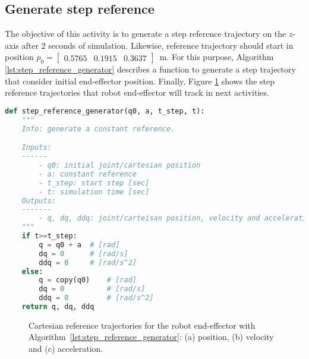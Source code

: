 \graphicspath{{images/act_1.2/}}
\subsection{Generate step reference}
\label{subsec:generate_step_reference}
The objective of this activity is to generate a step reference trajectory on the $z$-axis after $2$ seconds of simulation. Likewise, reference trajectory should start in position $p_0=\begin{bmatrix}  0.5765 &   0.1915 &   0.3637 \end{bmatrix}$~m. For this purpose, Algorithm \ref{lst:step_reference_generator} describes a function to generate a step trajectory that consider initial end-effector position. Finally, Figure \ref{fig:act_1.2_step_reference} shows the step reference trajectories that robot end-effector will track in next activities. \vspace{.5cm}

\begin{lstlisting}[language=Python,caption=Function to generate a step reference trajectory., label={lst:step_reference_generator}]
def step_reference_generator(q0, a, t_step, t):
    """
    Info: generate a constant reference.

    Inputs:
    ------
        - q0: initial joint/cartesian position
        - a: constant reference
        - t_step: start step [sec]
        - t: simulation time [sec]
    Outputs:
    -------
        - q, dq, ddq: joint/carteisan position, velocity and acceleration
    """
    if t>=t_step:
        q = q0 + a  # [rad]
        dq = 0      # [rad/s]
        ddq = 0     # [rad/s^2]
    else:
        q = copy(q0)    # [rad]
        dq = 0          # [rad/s]
        ddq = 0         # [rad/s^2]            
    return q, dq, ddq
\end{lstlisting}

\vspace*{0cm}
\begin{figure}
	\centering
	\hfill
	\hfill
	\caption{Cartesian reference trajectories for the robot end-effector with Algorithm~\ref{lst:step_reference_generator}: (a) position, (b) velocity and (c) acceleration.}
	\label{fig:act_1.2_step_reference}
\end{figure}

